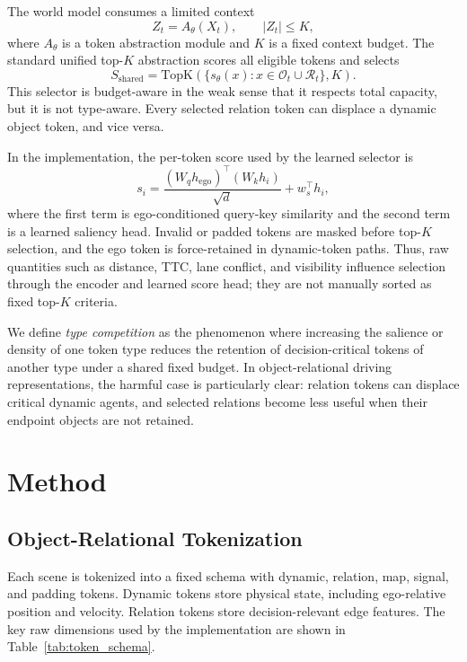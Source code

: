 \documentclass[10pt]{article}
\newcommand{\kctx}{K}
\begin{document}
The world model consumes a limited context
\begin{equation}
    Z_t = A_\theta(X_t), \qquad |Z_t| \leq \kctx,
\end{equation}
where $A_\theta$ is a token abstraction module and $\kctx$ is a fixed context budget. The standard unified top-$K$ abstraction scores all eligible tokens and selects
\begin{equation}
    S_{\mathrm{shared}} = \mathrm{TopK}\left(\{s_\theta(x): x \in \mathcal{O}_t \cup \mathcal{R}_t\}, \kctx\right).
\end{equation}
This selector is budget-aware in the weak sense that it respects total capacity, but it is not type-aware. Every selected relation token can displace a dynamic object token, and vice versa.

In the implementation, the per-token score used by the learned selector is
\begin{equation}
    s_i =
    \frac{(W_q h_{\mathrm{ego}})^\top (W_k h_i)}{\sqrt{d}}
    + w_s^\top h_i,
\end{equation}
where the first term is ego-conditioned query-key similarity and the second term is a learned saliency head. Invalid or padded tokens are masked before top-$K$ selection, and the ego token is force-retained in dynamic-token paths. Thus, raw quantities such as distance, TTC, lane conflict, and visibility influence selection through the encoder and learned score head; they are not manually sorted as fixed top-$K$ criteria.

We define \emph{type competition} as the phenomenon where increasing the salience or density of one token type reduces the retention of decision-critical tokens of another type under a shared fixed budget. In object-relational driving representations, the harmful case is particularly clear: relation tokens can displace critical dynamic agents, and selected relations become less useful when their endpoint objects are not retained.

\section{Method}
\subsection{Object-Relational Tokenization}
Each scene is tokenized into a fixed schema with dynamic, relation, map, signal, and padding tokens. Dynamic tokens store physical state, including ego-relative position and velocity. Relation tokens store decision-relevant edge features. The key raw dimensions used by the implementation are shown in Table~\ref{tab:token_schema}.
\end{document}
